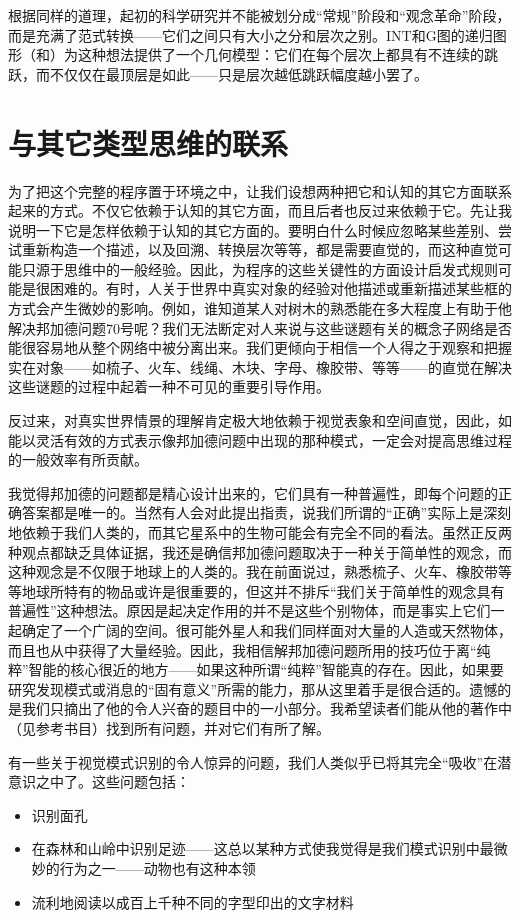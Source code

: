 根据同样的道理，起初的科学研究并不能被划分成“常规”阶段和“观念革命”阶段，而是充满了范式转换——它们之间只有大小之分和层次之别。INT和G图的递归图形（和）为这种想法提供了一个几何模型：它们在每个层次上都具有不连续的跳跃，而不仅仅在最顶层是如此——只是层次越低跳跃幅度越小罢了。

\section{与其它类型思维的联系}

为了把这个完整的程序置于环境之中，让我们设想两种把它和认知的其它方面联系起来的方式。不仅它依赖于认知的其它方面，而且后者也反过来依赖于它。先让我说明一下它是怎样依赖于认知的其它方面的。要明白什么时候应忽略某些差别、尝试重新构造一个描述，以及回溯、转换层次等等，都是需要直觉的，而这种直觉可能只源于思维中的一般经验。因此，为程序的这些关键性的方面设计启发式规则可能是很困难的。有时，人关于世界中真实对象的经验对他描述或重新描述某些框的方式会产生微妙的影响。例如，谁知道某人对树木的熟悉能在多大程度上有助于他解决邦加德问题70号呢？我们无法断定对人来说与这些谜题有关的概念子网络是否能很容易地从整个网络中被分离出来。我们更倾向于相信一个人得之于观察和把握实在对象——如梳子、火车、线绳、木块、字母、橡胶带、等等——的直觉在解决这些谜题的过程中起着一种不可见的重要引导作用。

反过来，对真实世界情景的理解肯定极大地依赖于视觉表象和空间直觉，因此，如能以灵活有效的方式表示像邦加德问题中出现的那种模式，一定会对提高思维过程的一般效率有所贡献。

我觉得邦加德的问题都是精心设计出来的，它们具有一种普遍性，即每个问题的正确答案都是唯一的。当然有人会对此提出指责，说我们所谓的“正确”实际上是深刻地依赖于我们人类的，而其它星系中的生物可能会有完全不同的看法。虽然正反两种观点都缺乏具体证据，我还是确信邦加德问题取决于一种关于简单性的观念，而这种观念是不仅限于地球上的人类的。我在前面说过，熟悉梳子、火车、橡胶带等等地球所特有的物品或许是很重要的，但这并不排斥“我们关于简单性的观念具有普遍性”这种想法。原因是起决定作用的并不是这些个别物体，而是事实上它们一起确定了一个广阔的空间。很可能外星人和我们同样面对大量的人造或天然物体，而且也从中获得了大量经验。因此，我相信解邦加德问题所用的技巧位于离“纯粹”智能的核心很近的地方——如果这种所谓“纯粹”智能真的存在。因此，如果要研究发现模式或消息的“固有意义”所需的能力，那从这里着手是很合适的。遗憾的是我们只摘出了他的令人兴奋的题目中的一小部分。我希望读者们能从他的著作中（见参考书目）找到所有问题，并对它们有所了解。

有一些关于视觉模式识别的令人惊异的问题，我们人类似乎已将其完全“吸收”在潜意识之中了。这些问题包括：
\begin{itemize}
\item 识别面孔
\item 在森林和山岭中识别足迹——这总以某种方式使我觉得是我们模式识别中最微妙的行为之一——动物也有这种本领
\item 流利地阅读以成百上千种不同的字型印出的文字材料
\end{itemize}

